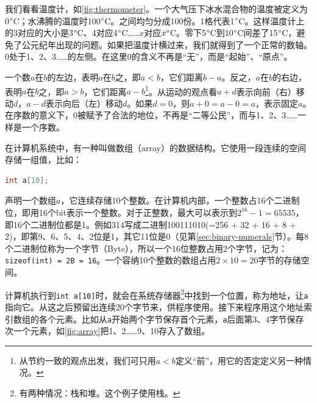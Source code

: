 \documentclass[b5paper]{ctexart}
\begin{document}
我们看看温度计，如\cref{fig:thermometer}。一个大气压下冰水混合物的温度被定义为0$\degree$C；水沸腾的温度时100$\degree$C。之间均匀分成100份。1格代表1$\degree$C。这样温度计上的3对应的大小是3$\degree$C、4对应4$\degree$C……$x$对应$x \degree$C。零下5$\degree$C到10$\degree$C间差了15$\degree$C，避免了公元纪年出现的问题。如果把温度计横过来，我们就得到了一个正常的数轴。0处于1、2、3……的左侧。在这里0的含义不再是“无”，而是“起始”、“原点”。

\begin{center}
\end{center}

\label{sec:zero-as-ordinal} 
一个数$a$在$b$的左边，表明$a$在$b$之，即$a < b$，它们距离$b - a$。反之，$a$在$b$的右边，表明$a$在$b$之，即$a > b$，它们距离$a - b$\footnote{从节约一致的观点出发，我们可只用$a<b$定义“前”，用它的否定定义另一种情况。}。从运动的观点看$a + d$表示向前（右）移动$d$，$a - d$表示向后（左）移动$d$。如果$d = 0$，则$a + 0 = a - 0 = a$，表示固定$a$。在序数的意义下，0被赋予了合法的地位，不再是“二等公民”，而与1、2、3……一样是一个序数。

在计算机系统中，有一种叫做数组（array）的数据结构。它使用一段连续的空间存储一组值，比如：

\begin{lstlisting}[language=C, frame=single]
int a[10];
\end{lstlisting}

声明一个数组$a$，它连续存储10个整数。在计算机内部，一个整数占16个二进制位，即用16个bit表示一个整数。对于正整数，最大可以表示到$2^{16}-1 = 65535$，即16个二进制位都是1。例如314写成二进制100111010(=256 + 32 + 16 + 8 + 2)，即第9、6、5、4、2位是1，其它11位是0（见第\ref{sec:binary-numerals}节）。每8个二进制位称为一个字节（Byte），所以一个16位整数占用2个字节，记为：\lstinline|sizeof(int) = 2B = 16|。一个容纳10个整数的数组占用$2 \times 10 = 20$字节的存储空间。

计算机执行到\lstinline|int a[10]|时，就会在系统存储器\footnote{有两种情况：栈和堆。这个例子使用栈。}中找到一个位置，称为地址，让\lstinline|a|指向它。从这之后预留出连续20个字节来，供程序使用。接下来程序用这个地址索引数组的各个元素。比如从\lstinline|a|开始两个字节保存首个元素，\lstinline|a|后面第3、4字节保存次一个元素，如\cref{fig:array}把1、2……9、10存入了数组。
\end{document}
